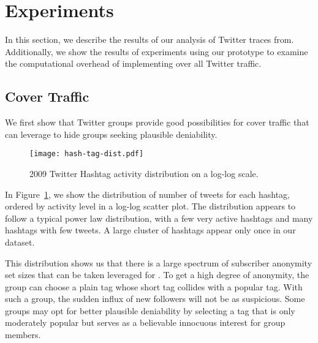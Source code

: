 \section{Experiments}
\label{sec:experiments}

In this section, we describe the results of our analysis of Twitter
traces from. Additionally, we show the results of experiments using our
prototype to examine the computational overhead of implementing \hoot
over all Twitter traffic.

\subsection{Cover Traffic}

We first show that Twitter groups provide good possibilities for cover
traffic that \hoot can leverage to hide groups seeking plausible
deniability.

\begin{figure}
\begin{center}
\texttt{[image: hash-tag-dist.pdf]}
\caption{2009 Twitter Hashtag activity distribution on a log-log
  scale.\label{fig:hash-dist}
}
\end{center}
\end{figure}

In Figure~\ref{fig:hash-dist}, we show the distribution of number of
tweets for each hashtag, ordered by activity level in a log-log scatter
plot.  The
distribution appears to follow a typical power law distribution, with a
few very active hashtags and many hashtags with few tweets. A large
cluster of hashtags appear only once in our dataset. 

This distribution shows us that there is a large spectrum of subscriber
anonymity set sizes that can be taken leveraged for \hoot. To get a high
degree of anonymity, the group can choose a plain tag whose short tag
collides with a popular tag. With such a group, the sudden influx of new
followers will not be as suspicious. Some groups may opt
for better plausible deniability by selecting a tag that is only
moderately popular but serves as a believable innocuous interest for
group members.

